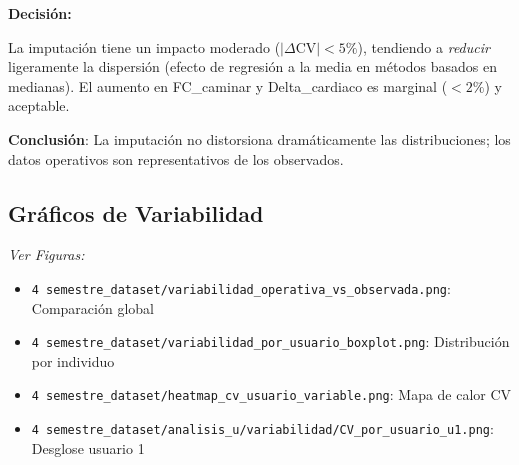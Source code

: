 \documentclass[12pt,letterpaper,twoside]{report}
\begin{document}
\begin{table}[H]
\centering
\caption{Coeficiente de Variación: Observado vs Operativo (promedio 10 usuarios)}
\label{tab:variability_dual}
\end{table}

\begin{decisionbox}
\textbf{Decisión:}

La imputación tiene un impacto moderado ($|\Delta\text{CV}| < 5\%$), tendiendo a \textit{reducir} ligeramente la dispersión (efecto de regresión a la media en métodos basados en medianas). El aumento en FC\_caminar y Delta\_cardiaco es marginal ($<2\%$) y aceptable.

\textbf{Conclusión}: La imputación no distorsiona dramáticamente las distribuciones; los datos operativos son representativos de los observados.
\end{decisionbox}

\subsection{Gráficos de Variabilidad}

\textit{Ver Figuras:}
\begin{itemize}[noitemsep]
    \item \texttt{4 semestre\_dataset/variabilidad\_operativa\_vs\_observada.png}: Comparación global
    \item \texttt{4 semestre\_dataset/variabilidad\_por\_usuario\_boxplot.png}: Distribución por individuo
    \item \texttt{4 semestre\_dataset/heatmap\_cv\_usuario\_variable.png}: Mapa de calor CV
    \item \texttt{4 semestre\_dataset/analisis\_u/variabilidad/CV\_por\_usuario\_u1.png}: Desglose usuario 1
\end{itemize}
\end{document}
